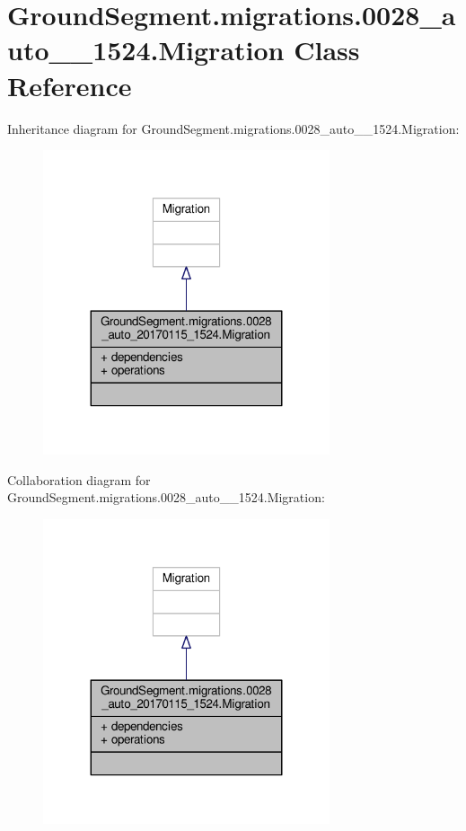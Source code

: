\hypertarget{class_ground_segment_1_1migrations_1_10028__auto__20170115__1524_1_1_migration}{}\section{Ground\+Segment.\+migrations.0028\+\_\+auto\+\_\+\_\+1524.Migration Class Reference}
\label{class_ground_segment_1_1migrations_1_10028__auto__20170115__1524_1_1_migration}


Inheritance diagram for Ground\+Segment.\+migrations.0028\+\_\+auto\+\_\+\_\+1524.Migration\+:\nopagebreak
\begin{figure}[H]
\begin{center}
\leavevmode
\includegraphics[width=239pt]{class_ground_segment_1_1migrations_1_10028__auto__20170115__1524_1_1_migration__inherit__graph}
\end{center}
\end{figure}


Collaboration diagram for Ground\+Segment.\+migrations.0028\+\_\+auto\+\_\+\_\+1524.Migration\+:\nopagebreak
\begin{figure}[H]
\begin{center}
\leavevmode
\includegraphics[width=239pt]{class_ground_segment_1_1migrations_1_10028__auto__20170115__1524_1_1_migration__coll__graph}
\end{center}
\end{figure}
